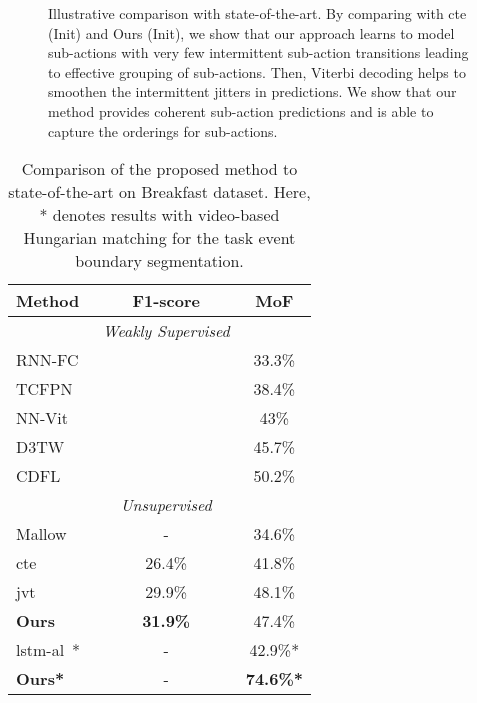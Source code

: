 \documentclass[final]{cvpr}
\begin{document}
\begin{figure}[tb]
\centering
{}
\hfil
{}
\caption{{\small Illustrative comparison with state-of-the-art. By comparing with {\sc cte} (Init) and Ours (Init), we show that our approach learns to model sub-actions with very few intermittent sub-action transitions leading to effective grouping of sub-actions.
Then, Viterbi decoding helps to smoothen the intermittent jitters in predictions.
We show that our method provides coherent sub-action predictions and is able to capture the orderings for sub-actions. 
}}
\vspace{-0.3cm}
\label{fig:qual_sota}
\end{figure}


\begin{table}[t]
  \caption{{\small Comparison of the proposed method to state-of-the-art on Breakfast dataset. Here, * denotes results with video-based Hungarian matching for the task event boundary segmentation.}}
  \label{tab:det_acc}
  \centering
  \small
  \begin{tabular}{lcc}
    \toprule
    {\bf Method} & {\bf F1-score} & {\bf MoF}\\
    \midrule
    &{\em  Weakly Supervised} & \\
    \midrule
    RNN-FC~\cite{rnnfc-richard2017weakly} &  & 33.3\%   \\
    TCFPN~\cite{tcfpn-ding2018weakly} &  & 38.4\%   \\
    NN-Vit~\cite{nnvit-richard2018neuralnetwork} &  & 43\%   \\
    D3TW~\cite{d3t-chang2019d3tw} &  & 45.7\%   \\
    CDFL~\cite{cdfl-li2019weakly} &  & 50.2\%   \\
    \midrule
     & {\em Unsupervised} & \\
    \midrule
    Mallow~\cite{sener2018unsupervised} & -  & 34.6\%   \\
    {\sc cte}~\cite{kukleva2019unsupervised}    & 26.4\% & 41.8\%      \\
    {\sc jvt}~\cite{vidalmata2020joint} & 29.9\% & 48.1\%      \\
    \hline
    \midrule
    {\bf Ours}     &\textbf{31.9\%}  &  47.4\%  \\
    \midrule
    \midrule
    {\sc lstm-al}~\cite{aakur2019perceptual}* & - & 42.9\%* \\
    {\bf Ours*}  & -  & \textbf{74.6\%*} \\
    \bottomrule
  \end{tabular}
\end{table}
\end{document}
